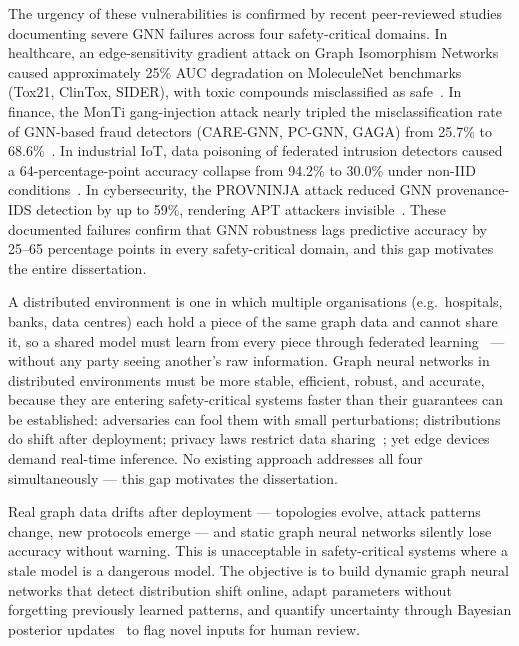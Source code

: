 The urgency of these vulnerabilities is confirmed by recent peer-reviewed studies documenting severe GNN failures across four safety-critical domains. In healthcare, an edge-sensitivity gradient attack on Graph Isomorphism Networks caused approximately 25\% AUC degradation on MoleculeNet benchmarks (Tox21, ClinTox, SIDER), with toxic compounds misclassified as safe~\cite{EdgeSensitivity2025}. In finance, the MonTi gang-injection attack nearly tripled the misclassification rate of GNN-based fraud detectors (CARE-GNN, PC-GNN, GAGA) from 25.7\% to 68.6\%~\cite{MonTi2025}. In industrial IoT, data poisoning of federated intrusion detectors caused a 64-percentage-point accuracy collapse from 94.2\% to 30.0\% under non-IID conditions~\cite{FerragPoisoning2023}. In cybersecurity, the PROVNINJA attack reduced GNN provenance-IDS detection by up to 59\%, rendering APT attackers invisible~\cite{PROVNINJA2023}. These documented failures confirm that GNN robustness lags predictive accuracy by 25--65 percentage points in every safety-critical domain, and this gap motivates the entire dissertation.

A distributed environment is one in which multiple organisations (e.g.\ hospitals, banks, data centres) each hold a piece of the same graph data and cannot share it, so a shared model must learn from every piece through federated learning~\cite{Blanchard2017} --- without any party seeing another's raw information. Graph neural networks in distributed environments must be more stable, efficient, robust, and accurate, because they are entering safety-critical systems faster than their guarantees can be established: adversaries can fool them with small perturbations; distributions do shift after deployment; privacy laws restrict data sharing~\cite{Dwork2006,Abadi2016}; yet edge devices demand real-time inference. No existing approach addresses all four simultaneously --- this gap motivates the dissertation.

Real graph data drifts after deployment --- topologies evolve, attack patterns change, new protocols emerge --- and static graph neural networks silently lose accuracy without warning. This is unacceptable in safety-critical systems where a stale model is a dangerous model. The objective is to build dynamic graph neural networks that detect distribution shift online, adapt parameters without forgetting previously learned patterns, and quantify uncertainty through Bayesian posterior updates~\cite{Gal2016,Kendall2017} to flag novel inputs for human review.

